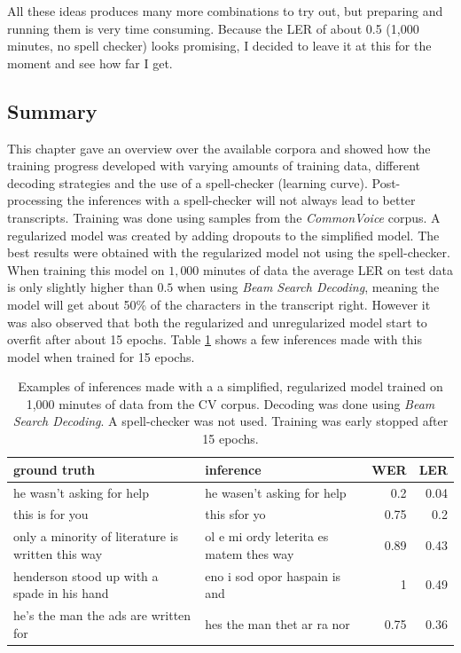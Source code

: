 All these ideas produces many more combinations to try out, but preparing and running them is very time consuming. Because the \ac{LER} of about 0.5 (1,000 minutes, no spell checker) looks promising, I decided to leave it at this for the moment and see how far I get.

\subsection{Summary}

This chapter gave an overview over the available corpora and showed how the training progress developed with varying amounts of training data, different decoding strategies and the use of a spell-checker (learning curve). Post-processing the inferences with a spell-checker will not always lead to better transcripts. Training was done using samples from the \textit{CommonVoice} corpus. A regularized model was created by adding dropouts to the simplified model. The best results were obtained with the regularized model not using the spell-checker.  When training this model on $1,000$ minutes of data the average \ac{LER} on test data is only slightly higher than $0.5$ when using \textit{Beam Search Decoding}, meaning the model will get about 50\% of the characters in the transcript right. However it was also observed that both the regularized and unregularized model start to overfit after about 15 epochs. Table \ref{inference_samples} shows a few inferences made with this model when trained for 15 epochs.

\begin{table}[h!]
	\centering
	\begin{tabular}{llrr}
		\toprule
		ground truth & inference & \ac{WER} & \ac{LER} \\
		\midrule
		he wasn't asking for help & he wasen't asking for help & 0.2 & 0.04 \\
		this is for you & this sfor yo & 0.75 & 0.2 \\
		only a minority of literature is written this way & ol e mi ordy leterita es matem thes way & 0.89 & 0.43 \\
		henderson stood up with a spade in his hand	& eno i sod opor haspain is and & 1 & 0.49 \\	
		he's the man the ads are written for & hes the man thet ar ra nor & 0.75 & 0.36 \\
		\bottomrule
	\end{tabular}
	\caption{Examples of inferences made with a a simplified, regularized model trained on 1,000 minutes of data from the \ac{CV} corpus. Decoding was done using \textit{Beam Search Decoding}. A spell-checker was not used. Training was early stopped after 15 epochs.}
	\label{inference_samples}
\end{table}